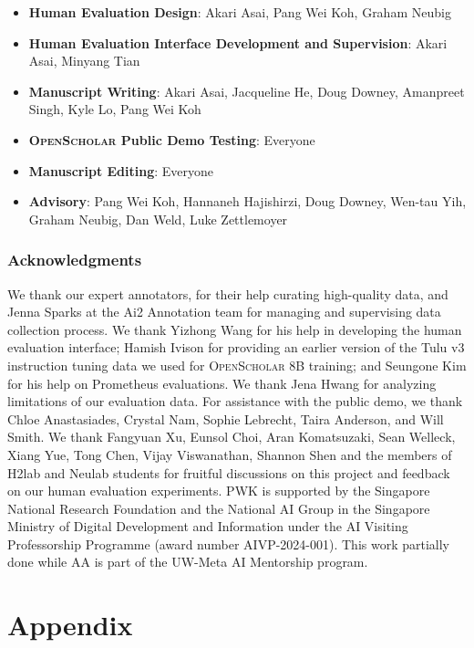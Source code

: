 \documentclass{article} %
\newcommand{\model}{\textsc{OpenScholar}\xspace}
\begin{document}
\begin{itemize}[itemsep=1.6pt,leftmargin=12pt,topsep=1.6pt]
    \item {\bf Human Evaluation Design}: Akari Asai, Pang Wei Koh, Graham Neubig
    \item {\bf Human Evaluation Interface Development and Supervision}: Akari Asai, Minyang Tian
    \item {\bf Manuscript Writing}: Akari Asai, Jacqueline He, Doug Downey, Amanpreet Singh, Kyle Lo, Pang Wei Koh
    \item {\bf \model Public Demo Testing}: Everyone
    \item {\bf Manuscript Editing}: Everyone
    \item {\bf Advisory}: Pang Wei Koh, Hannaneh Hajishirzi, Doug Downey, Wen-tau Yih, Graham Neubig, Dan Weld, Luke Zettlemoyer 
\end{itemize}


\subsubsection*{Acknowledgments}
We thank our expert annotators, for their help curating high-quality data, and Jenna Sparks at the Ai2 Annotation team for managing and supervising data collection process. 
 We thank Yizhong Wang for his help in developing the human evaluation interface; Hamish Ivison for providing an earlier version of the Tulu v3 instruction tuning data we used for \model 8B training; and Seungone Kim for his help on Prometheus evaluations. We thank Jena Hwang for analyzing limitations of our evaluation data.
 For assistance with the public demo, we thank Chloe Anastasiades, Crystal Nam, Sophie Lebrecht, Taira Anderson, and Will Smith. 
We thank Fangyuan Xu, Eunsol Choi, Aran Komatsuzaki, Sean Welleck, Xiang Yue, Tong Chen, Vijay Viswanathan, Shannon Shen and the members of H2lab and Neulab students for fruitful discussions on this project and feedback on our human evaluation experiments. 
PWK is supported by the Singapore National Research Foundation and the National AI Group in the Singapore Ministry of Digital Development and Information under the AI Visiting Professorship Programme (award number AIVP-2024-001). 
This work partially done while AA is part of the UW-Meta AI Mentorship program. 





\newpage
\appendix
\section*{Appendix}
\end{document}
